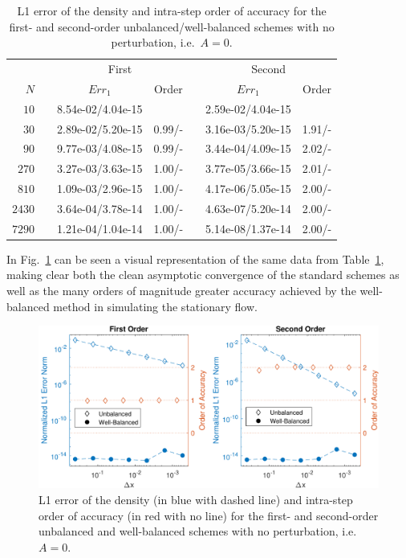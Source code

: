\begin{table}\centering
\caption{L1 error of the density and intra-step order of accuracy for the first- and second-order unbalanced/well-balanced schemes with no perturbation, i.e.\ $A=0$.}
\label{table:OVS_A0}
\begin{tabular}{@{}rcccccc@{}}\toprule
& \phantom{a} & \multicolumn{2}{c}{First} & \phantom{ab} & \multicolumn{2}{c}{Second}\\
\cmidrule{3-4} \cmidrule{6-7}
$N$ && $Err_1$ & Order && $Err_1$ & Order\\ \midrule
$10$ && 8.54e-02/4.04e-15 &&& 2.59e-02/4.04e-15 &\\
$30$ && 2.89e-02/5.20e-15 & 0.99/- && 3.16e-03/5.20e-15 & 1.91/-\\
$90$ && 9.77e-03/4.08e-15 & 0.99/- && 3.44e-04/4.09e-15 & 2.02/-\\
$270$ && 3.27e-03/3.63e-15 & 1.00/- && 3.77e-05/3.66e-15 & 2.01/-\\
$810$ && 1.09e-03/2.96e-15 & 1.00/- && 4.17e-06/5.05e-15 & 2.00/-\\
$2430$ && 3.64e-04/3.78e-14 & 1.00/- && 4.63e-07/5.20e-14 & 2.00/-\\
$7290$ && 1.21e-04/1.04e-14 & 1.00/- && 5.14e-08/1.37e-14 & 2.00/-\\
\bottomrule
\end{tabular}
\end{table}

In Fig.~\ref{fig:OVS_A0} can be seen a visual representation of the same data from Table~\ref{table:OVS_A0}, making clear both the clean asymptotic convergence of the standard schemes as well as the many orders of magnitude greater accuracy achieved by the well-balanced method in simulating the stationary flow.

\begin {figure}
\centering
\includegraphics[width=13cm]{figures/OVSeps0}
\caption {L1 error of the density (in blue with dashed line) and intra-step order of accuracy (in red with no line) for the first- and second-order unbalanced and well-balanced schemes with no perturbation, i.e.\ $A=0$.}
\label{fig:OVS_A0}
\end{figure}

